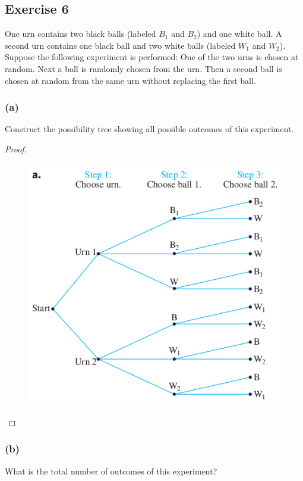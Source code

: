 \documentclass[14pt]{extarticle}
\begin{document}
\subsection{Exercise 6}
One urn contains two black balls (labeled \(B_1\) and \(B_2\)) and one white ball. A second urn contains one black 
ball and two white balls (labeled \(W_1\) and \(W_2\)). Suppose the following experiment is performed: One of the 
two urns is chosen at random. Next a ball is randomly chosen from the urn. Then a second ball is chosen at random 
from the same urn without replacing the first ball.

\subsubsection{(a)}
Construct the possibility tree showing all possible outcomes of this experiment.

\begin{proof}
\begin{figure}[ht!]
\centering
\includegraphics[scale=0.5]{../images/9.2.6.a.png}
\end{figure}
\end{proof}

\subsubsection{(b)}
What is the total number of outcomes of this experiment?
\end{document}
